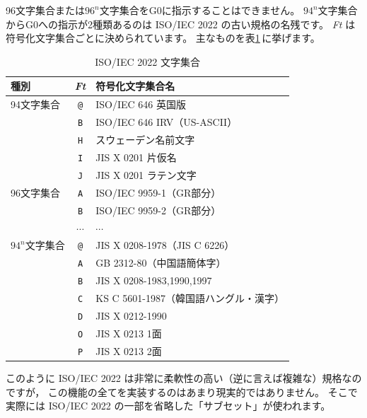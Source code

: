 \documentclass[a4j,10pt,fleqn]{jsarticle}
\begin{document}
96文字集合または$96^n$文字集合をG0に指示することはできません。
$94^n$文字集合からG0への指示が2種類あるのは ISO/IEC 2022 の古い規格の名残です。
\textit{Ft} は符号化文字集合ごとに決められています。
主なものを表\ref{tbl:ISO2022-charset}\,に挙げます。
\begin{table}[htp]
\begin{center}\begin{tabular}{|l|c|l|}
    \hline
    種別          & \textit{Ft} & 符号化文字集合名 \\ \hline
    \hline
    94文字集合     & \texttt{@} & ISO/IEC 646 英国版 \\ \cline{2-3}
                   & \texttt{B} & ISO/IEC 646 IRV（US-ASCII） \\ \cline{2-3}
                   & \texttt{H} & スウェーデン名前文字 \\ \cline{2-3}
                   & \texttt{I} & JIS X 0201 片仮名 \\ \cline{2-3}
                   & \texttt{J} & JIS X 0201 ラテン文字 \\ \hline
    \hline
    96文字集合     & \texttt{A} & ISO/IEC 9959-1（GR部分） \\ \cline{2-3}
                   & \texttt{B} & ISO/IEC 9959-2（GR部分） \\ \cline{2-3}
                   & $\cdots$   & $\cdots$ \\ \hline
    \hline
    $94^n$文字集合 & \texttt{@} & JIS X 0208-1978（JIS C 6226） \\ \cline{2-3}
                   & \texttt{A} & GB 2312-80（中国語簡体字） \\ \cline{2-3}
                   & \texttt{B} & JIS X 0208-1983,1990,1997 \\ \cline{2-3}
                   & \texttt{C} & KS C 5601-1987（韓国語ハングル・漢字） \\ \cline{2-3}
                   & \texttt{D} & JIS X 0212-1990 \\ \cline{2-3}
                   & \texttt{O} & JIS X 0213 1面 \\ \cline{2-3}
                   & \texttt{P} & JIS X 0213 2面 \\ \hline
\end{tabular}\end{center}
\caption{ISO/IEC 2022 文字集合}\label{tbl:ISO2022-charset}
\end{table}

このように ISO/IEC 2022 は非常に柔軟性の高い（逆に言えば複雑な）規格なのですが，
この機能の全てを実装するのはあまり現実的ではありません。
そこで実際には ISO/IEC 2022 の一部を省略した「サブセット」が使われます。
\end{document}
